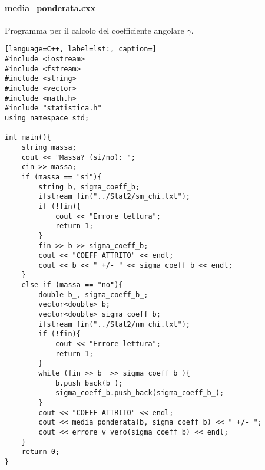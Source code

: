 \documentclass[a4paper,11pt,oneside]{article}
\begin{document}
\paragraph{media_ponderata.cxx} Programma per il calcolo del coefficiente angolare $\gamma$.
\begin{lstlisting}[language=C++, label=lst:, caption=]
#include <iostream>
#include <fstream>
#include <string>
#include <vector>
#include <math.h>
#include "statistica.h"
using namespace std;

int main(){
    string massa;
    cout << "Massa? (si/no): ";
    cin >> massa;
    if (massa == "si"){
        string b, sigma_coeff_b;
        ifstream fin("../Stat2/sm_chi.txt");
        if (!fin){
            cout << "Errore lettura";
            return 1;
        }
        fin >> b >> sigma_coeff_b;
        cout << "COEFF ATTRITO" << endl;
        cout << b << " +/- " << sigma_coeff_b << endl;
    }
    else if (massa == "no"){
        double b_, sigma_coeff_b_;
        vector<double> b;
        vector<double> sigma_coeff_b;
        ifstream fin("../Stat2/nm_chi.txt");
        if (!fin){
            cout << "Errore lettura";
            return 1;
        }
        while (fin >> b_ >> sigma_coeff_b_){
            b.push_back(b_);
            sigma_coeff_b.push_back(sigma_coeff_b_);
        }
        cout << "COEFF ATTRITO" << endl;
        cout << media_ponderata(b, sigma_coeff_b) << " +/- ";
        cout << errore_v_vero(sigma_coeff_b) << endl;
    }
    return 0;
}
\end{lstlisting}
\end{document}
